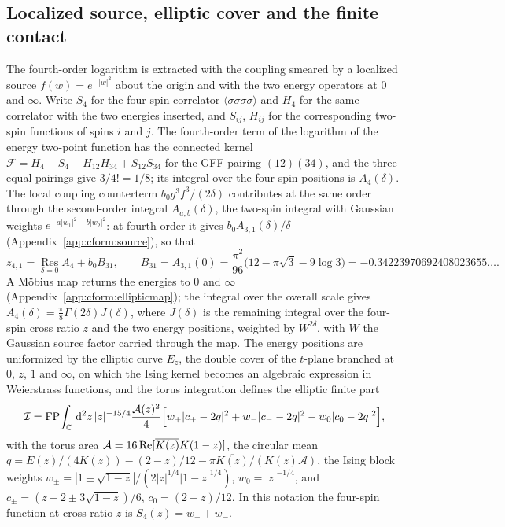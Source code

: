 \documentclass[11pt,a4paper]{article}
\numberwithin{equation}{section}
\newcommand{\dd}{\,\mathrm d}
\newcommand{\FP}{\operatorname{FP}}
\newcommand{\Res}{\operatorname*{Res}_{\delta=0}}
\newcommand{\cI}{\mathcal I}
\begin{document}
\subsection{Localized source, elliptic cover and the finite contact}\label{sec:source2}
The fourth-order logarithm is extracted with the coupling smeared by a localized source $f(w)=e^{-|w|^2}$ about the
origin and with the two energy operators at $0$ and $\infty$. Write $S_4$ for the four-spin correlator
$\langle\sigma\sigma\sigma\sigma\rangle$ and $H_4$ for the same correlator with the two energies inserted, and $S_{ij}$,
$H_{ij}$ for the corresponding two-spin functions of spins $i$ and $j$. The fourth-order term of the logarithm of the
energy two-point function has the connected kernel $\mathcal F=H_4-S_4-H_{12}H_{34}+S_{12}S_{34}$ for the GFF pairing
$(12)(34)$, and the three equal pairings give $3/4!=1/8$; its integral over the four spin positions is $A_4(\delta)$.
The local coupling counterterm $b_0g^3f^3/(2\delta)$ contributes at the same order through the second-order integral
$A_{a,b}(\delta)$, the two-spin integral with Gaussian weights $e^{-a|w_1|^2-b|w_2|^2}$: at fourth order it gives
$b_0A_{3,1}(\delta)/\delta$ (Appendix~\ref{app:cform:source}), so that
\begin{equation}
 z_{4,1}=\Res A_4+b_0B_{31},\qquad B_{31}=A_{3,1}(0)=\frac{\pi^2}{96}\bigl(12-\pi\sqrt3-9\log3\bigr)=-0.34223970692408023655\ldots.
\end{equation}
A M\"obius map returns the energies to $0$ and $\infty$ (Appendix~\ref{app:cform:ellipticmap}); the integral over the
overall scale gives $A_4(\delta)=\frac\pi8\Gamma(2\delta)J(\delta)$, where $J(\delta)$ is the remaining integral over the
four-spin cross ratio $z$ and the two energy positions, weighted by $W^{2\delta}$, with $W$ the Gaussian source factor
carried through the map. The energy positions are uniformized by the elliptic curve $E_z$, the double cover of the $t$-plane branched at
$0$, $z$, $1$ and $\infty$, on which the
Ising kernel becomes an algebraic expression in Weierstrass functions, and the torus integration defines the
elliptic finite part
\begin{equation}
 \cI=\FP\!\int_{\mathbb C}\dd^2z\,|z|^{-15/4}\frac{\mathcal A(z)^2}{4}
 \Bigl[w_+|c_+-2q|^2+w_-|c_--2q|^2-w_0|c_0-2q|^2\Bigr],
 \label{eq:I}
\end{equation}
with the torus area $\mathcal A=16\,{\rm Re}[\overline{K(z)}K(1-z)]$, the circular mean
$q=E(z)/(4K(z))-(2-z)/12-\pi\overline{K(z)}/(K(z)\mathcal A)$, the Ising block weights
$w_\pm=|1\pm\sqrt{1-z}|/(2|z|^{1/4}|1-z|^{1/4})$, $w_0=|z|^{-1/4}$, and $c_\pm=(z-2\pm3\sqrt{1-z})/6$,
$c_0=(2-z)/12$. In this notation the four-spin function at cross ratio $z$ is $S_4(z)=w_++w_-$.
\end{document}
